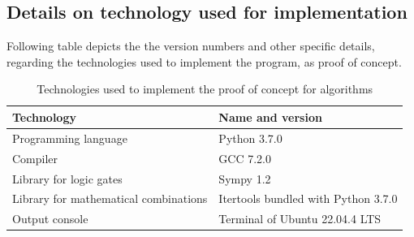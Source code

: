 \subsection{Details on technology used for implementation}
Following table depicts the the version numbers and other specific details, regarding the technologies used to implement the program, as proof of concept.\\
\begin{table}[H]
    \renewcommand{\arraystretch}{1.5}
    \centering
    \begin{tabular}{|l|l|}
    \hline
    \textbf{Technology} & \textbf{Name and version} \\
    \hline
    Programming language & Python 3.7.0 \\
    \hline
    Compiler & GCC 7.2.0 \\
    \hline
    Library for logic gates & Sympy 1.2 \\
    \hline
    Library for mathematical combinations & Itertools bundled with Python 3.7.0 \\
    \hline
    Output console & Terminal of Ubuntu 22.04.4 LTS \\
    \hline
    \end{tabular}
    \caption{Technologies used to implement the proof of concept for algorithms}
    \label{tab:technologies used to implement the proof of concept for algorithms}
\end{table}

